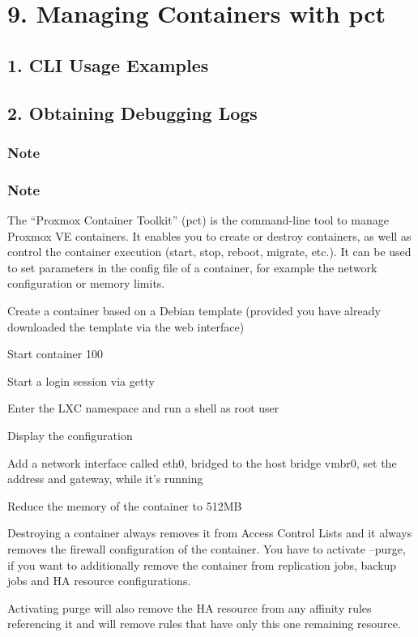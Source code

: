 \section{9. Managing Containers with pct}

\subsection{1. CLI Usage Examples}

\subsection{2. Obtaining Debugging Logs}

\subsubsection{Note}

\subsubsection{Note}

The “Proxmox Container Toolkit” (pct) is the command-line tool to manage Proxmox VE containers. It enables you to create or destroy containers, as well as control the container execution (start, stop, reboot, migrate, etc.). It can be used to set parameters in the config file of a container, for example the network configuration or memory limits.

Create a container based on a Debian template (provided you have already downloaded the template via the web interface)

Start container 100

Start a login session via getty

Enter the LXC namespace and run a shell as root user

Display the configuration

Add a network interface called eth0, bridged to the host bridge vmbr0, set the address and gateway, while it’s running

Reduce the memory of the container to 512MB

Destroying a container always removes it from Access Control Lists and it always removes the firewall configuration of the container. You have to activate --purge, if you want to additionally remove the container from replication jobs, backup jobs and HA resource configurations.

Activating purge will also remove the HA resource from any affinity rules referencing it and will remove rules that have only this one remaining resource.

